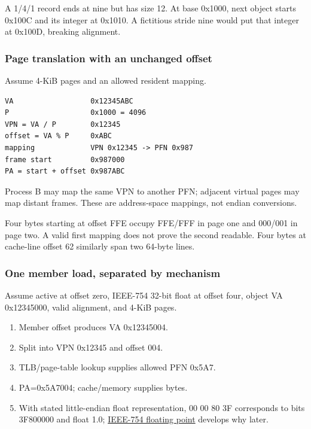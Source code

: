 A 1/4/1 record ends at nine but has size 12. At base 0x1000, next object starts 0x100C and its integer at 0x1010. A fictitious stride nine would put that integer at 0x100D, breaking alignment.

\subsubsection{Page translation with an unchanged offset}\label{appendix-92ff77d4dfdc-page-translation-with-an-unchanged-offset}

Assume 4-KiB pages and an allowed resident mapping.

\begin{verbatim}
VA                  0x12345ABC
P                   0x1000 = 4096
VPN = VA / P        0x12345
offset = VA % P     0xABC
mapping             VPN 0x12345 -> PFN 0x987
frame start         0x987000
PA = start + offset 0x987ABC
\end{verbatim}

Process B may map the same VPN to another PFN; adjacent virtual pages may map distant frames. These are address-space mappings, not endian conversions.

Four bytes starting at offset FFE occupy FFE/FFF in page one and 000/001 in page two. A valid first mapping does not prove the second readable. Four bytes at cache-line offset 62 similarly span two 64-byte lines.

\subsubsection{One member load, separated by mechanism}\label{appendix-92ff77d4dfdc-one-member-load-separated-by-mechanism}

Assume active at offset zero, IEEE-754 32-bit float at offset four, object VA 0x12345000, valid alignment, and 4-KiB pages.

\begin{enumerate}
\def\labelenumi{\arabic{enumi}.}
\tightlist
\item
  Member offset produces VA 0x12345004.
\item
  Split into VPN 0x12345 and offset 004.
\item
  TLB/page-table lookup supplies allowed PFN 0x5A7.
\item
  PA=0x5A7004; cache/memory supplies bytes.
\item
  With stated little-endian float representation, 00 00 80 3F corresponds to bits 3F800000 and float 1.0; \hyperref[appendix-343615f49ddf]{IEEE-754 floating point} develops why later.
\end{enumerate}

